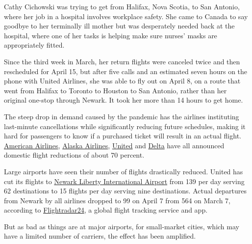 Cathy Cichowski was trying to get from Halifax, Nova Scotia, to San
Antonio, where her job in a hospital involves workplace safety. She came
to Canada to say goodbye to her terminally ill mother but was
desperately needed back at the hospital, where one of her tasks is
helping make sure nurses' masks are appropriately fitted.

Since the third week in March, her return flights were canceled twice
and then rescheduled for April 15, but after five calls and an estimated
seven hours on the phone with United Airlines, she was able to fly out
on April 8, on a route that went from Halifax to Toronto to Houston to
San Antonio, rather than her original one-stop through Newark. It took
her more than 14 hours to get home.

The steep drop in demand caused by the pandemic has the airlines
instituting last-minute cancellations while significantly reducing
future schedules, making it hard for passengers to know if a purchased
ticket will result in an actual flight.
\href{http://news.aa.com/news/news-details/2020/American-Airlines-Announces-Additional-Schedule-Suspensions-in-Response-to-Reduced-Customer-Demand-Related-to-Covid-19-OPS-DIS-03/}{American
Airlines},
\href{https://newsroom.alaskaair.com/2020-03-25-Alaska-Airlines-announces-schedule-reductions-and-other-changes-to-conserve-cash}{Alaska
Airlines},
\href{https://hub.united.com/united-flight-reductions-suspensions-2020-2645514815.html}{United}
and
\href{https://www.sec.gov/Archives/edgar/data/27904/000168316820000862/delta_8k-ex9901.htm}{Delta}
have all announced domestic flight reductions of about 70 percent.

Large airports have seen their number of flights drastically reduced.
United has cut its flights to
\href{https://www.newarkairport.com/}{Newark Liberty International
Airport} from 139 per day serving 62 destinations to 15 flights per day
serving nine destinations. Actual departures from Newark by all airlines
dropped to 99 on April 7 from 564 on March 7, according to
\href{https://nam12.safelinks.protection.outlook.com/?url=https\%3A\%2F\%2Fwww.flightradar24.com\%2F\&data=02\%7C01\%7C\%7Cf14d5395d0404c43711f08d7dbd96beb\%7C84df9e7fe9f640afb435aaaaaaaaaaaa\%7C1\%7C0\%7C637219600188882112\&sdata=YnA3uaivNvfdYOiOlpTmiyS7O\%2F6nldB\%2BFWs2sRQHmKE\%3D\&reserved=0}{Flightradar24},
a global flight tracking service and app.

But as bad as things are at major airports, for small-market cities,
which may have a limited number of carriers, the effect has been
amplified.

